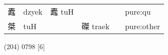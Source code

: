\documentclass[14pt,a4paper]{scrartcl}
\begin{document}
\begin{longtable}[c]{@{}llllll@{}}
\begin{minipage}[t]{0.14\columnwidth}
蠹
\strut\end{minipage} &
\begin{minipage}[t]{0.14\columnwidth}\raggedright\strut
dzyek
\strut\end{minipage} &
\begin{minipage}[t]{0.14\columnwidth}\raggedright\strut
蠹 tuH
\strut\end{minipage} &
\begin{minipage}[t]{0.14\columnwidth}\raggedright\strut
\strut\end{minipage} &
\begin{minipage}[t]{0.14\columnwidth}\raggedright\strut
\strut\end{minipage} &
\begin{minipage}[t]{0.14\columnwidth}\raggedright\strut
pure:qu
\strut\end{minipage}\tabularnewline
\begin{minipage}[t]{0.14\columnwidth}\raggedright\strut
桀
\strut\end{minipage} &
\begin{minipage}[t]{0.14\columnwidth}\raggedright\strut
tuH
\strut\end{minipage} &
\begin{minipage}[t]{0.14\columnwidth}\raggedright\strut
\strut\end{minipage} &
\begin{minipage}[t]{0.14\columnwidth}\raggedright\strut
磔 traek
\strut\end{minipage} &
\begin{minipage}[t]{0.14\columnwidth}\raggedright\strut
\strut\end{minipage} &
\begin{minipage}[t]{0.14\columnwidth}\raggedright\strut
pure:other
\strut\end{minipage}\tabularnewline
\bottomrule
\end{longtable}

(204) 0798 {[}6{]}
\end{document}
